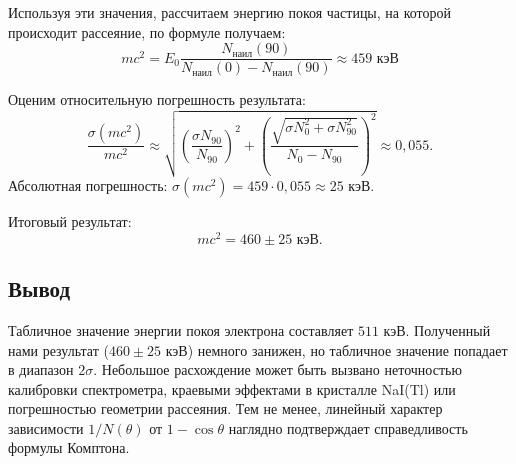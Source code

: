 \documentclass[12pt, a4paper]{article}
\begin{document}
Используя эти значения, рассчитаем энергию покоя частицы, на которой происходит рассеяние, по формуле получаем:
\begin{equation}
    mc^2 = E_0 \frac{N_{\text{наил}}(90)}{N_{\text{наил}}(0) - N_{\text{наил}}(90)} \approx 459 \text{ кэВ}
\end{equation}


Оценим относительную погрешность результата:%
\begin{equation}
    \frac{\sigma(mc^2)}{mc^2} \approx \sqrt{ \left(\frac{\sigma N_{90}}{N_{90}}\right)^2 + \left(\frac{\sqrt{\sigma N_0^2 + \sigma N_{90}^2}}{N_0 - N_{90}}\right)^2 } \approx 0,055.
\end{equation}
Абсолютная погрешность: $\sigma(mc^2) = 459 \cdot 0,055 \approx 25$ кэВ.

Итоговый результат:
\begin{equation}
    mc^2 = 460 \pm 25 \text{ кэВ}.
\end{equation}

\subsection*{Вывод}
Табличное значение энергии покоя электрона составляет $511$ кэВ. Полученный нами результат ($460 \pm 25$ кэВ) немного занижен, но табличное значение попадает в диапазон $2\sigma$. Небольшое расхождение может быть вызвано неточностью калибровки спектрометра, краевыми эффектами в кристалле NaI(Tl) или погрешностью геометрии рассеяния. Тем не менее, линейный характер зависимости $1/N(\theta)$ от $1 - \cos\theta$ наглядно подтверждает справедливость формулы Комптона.
\end{document}
